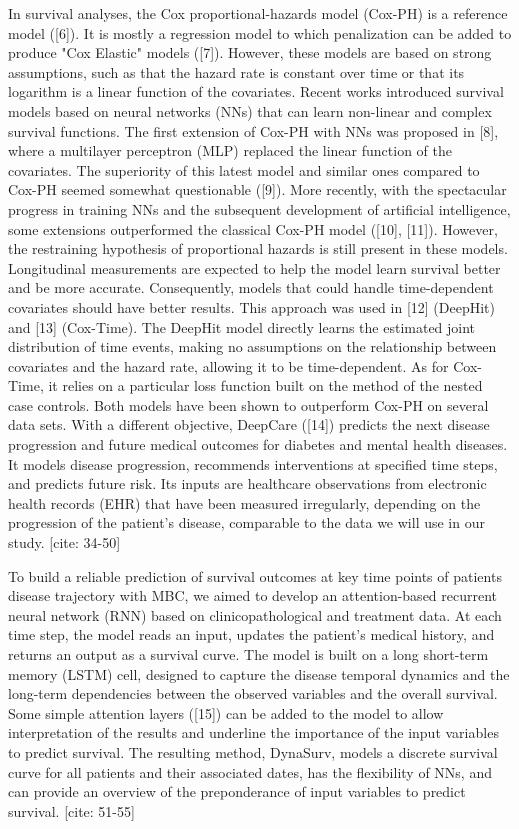 \documentclass[a4paper,10pt]{article}
\begin{document}
In survival analyses, the Cox proportional-hazards model (Cox-PH) is a reference model ([6]). It is mostly a regression model to which penalization can be added to produce "Cox Elastic" models ([7]). However, these models are based on strong assumptions, such as that the hazard rate is constant over time or that its logarithm is a linear function of the covariates. Recent works introduced survival models based on neural networks (NNs) that can learn non-linear and complex survival functions. The first extension of Cox-PH with NNs was proposed in [8], where a multilayer perceptron (MLP) replaced the linear function of the covariates. The superiority of this latest model and similar ones compared to Cox-PH seemed somewhat questionable ([9]). More recently, with the spectacular progress in training NNs and the subsequent development of artificial intelligence, some extensions outperformed the classical Cox-PH model ([10], [11]). However, the restraining hypothesis of proportional hazards is still present in these models. Longitudinal measurements are expected to help the model learn survival better and be more accurate. Consequently, models that could handle time-dependent covariates should have better results. This approach was used in [12] (DeepHit) and [13] (Cox-Time). The DeepHit model directly learns the estimated joint distribution of time events, making no assumptions on the relationship between covariates and the hazard rate, allowing it to be time-dependent. As for Cox-Time, it relies on a particular loss function built on the method of the nested case controls. Both models have been shown to outperform Cox-PH on several data sets. With a different objective, DeepCare ([14]) predicts the next disease progression and future medical outcomes for diabetes and mental health diseases. It models disease progression, recommends interventions at specified time steps, and predicts future risk. Its inputs are healthcare observations from electronic health records (EHR) that have been measured irregularly, depending on the progression of the patient's disease, comparable to the data we will use in our study. [cite: 34-50]

To build a reliable prediction of survival outcomes at key time points of patients disease trajectory with MBC, we aimed to develop an attention-based recurrent neural network (RNN) based on clinicopathological and treatment data. At each time step, the model reads an input, updates the patient's medical history, and returns an output as a survival curve. The model is built on a long short-term memory (LSTM) cell, designed to capture the disease temporal dynamics and the long-term dependencies between the observed variables and the overall survival. Some simple attention layers ([15]) can be added to the model to allow interpretation of the results and underline the importance of the input variables to predict survival. The resulting method, DynaSurv, models a discrete survival curve for all patients and their associated dates, has the flexibility of NNs, and can provide an overview of the preponderance of input variables to predict survival. [cite: 51-55]
\end{document}
